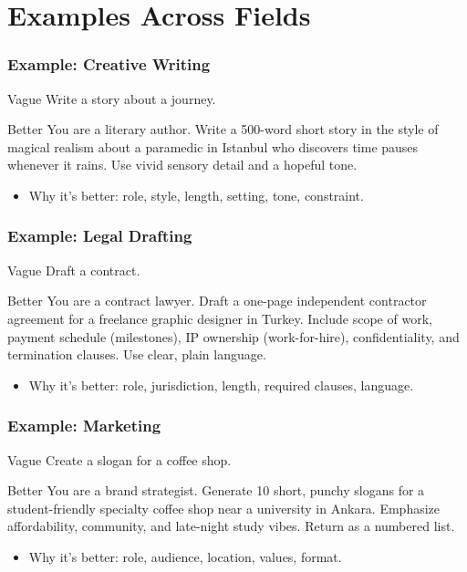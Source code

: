 \documentclass[11pt]{beamer}
\begin{document}
\section{Examples Across Fields}
\begin{frame}
  \frametitle{Example: Creative Writing}
  \begin{block}{Vague}
  Write a story about a journey.
  \end{block}
  \begin{block}{Better}
  You are a literary author. Write a 500-word short story in the style of magical realism about a paramedic in Istanbul who discovers time pauses whenever it rains. Use vivid sensory detail and a hopeful tone.
  \end{block}
  \begin{itemize}
    \item Why it's better: role, style, length, setting, tone, constraint.
  \end{itemize}
\end{frame}

\begin{frame}
  \frametitle{Example: Legal Drafting}
  \begin{block}{Vague}
  Draft a contract.
  \end{block}
  \begin{block}{Better}
  You are a contract lawyer. Draft a one-page independent contractor agreement for a freelance graphic designer in Turkey. Include scope of work, payment schedule (milestones), IP ownership (work-for-hire), confidentiality, and termination clauses. Use clear, plain language.
  \end{block}
  \begin{itemize}
    \item Why it's better: role, jurisdiction, length, required clauses, language.
  \end{itemize}
\end{frame}

\begin{frame}
  \frametitle{Example: Marketing}
  \begin{block}{Vague}
  Create a slogan for a coffee shop.
  \end{block}
  \begin{block}{Better}
  You are a brand strategist. Generate 10 short, punchy slogans for a student-friendly specialty coffee shop near a university in Ankara. Emphasize affordability, community, and late-night study vibes. Return as a numbered list.
  \end{block}
  \begin{itemize}
    \item Why it's better: role, audience, location, values, format.
  \end{itemize}
\end{frame}
\end{document}
